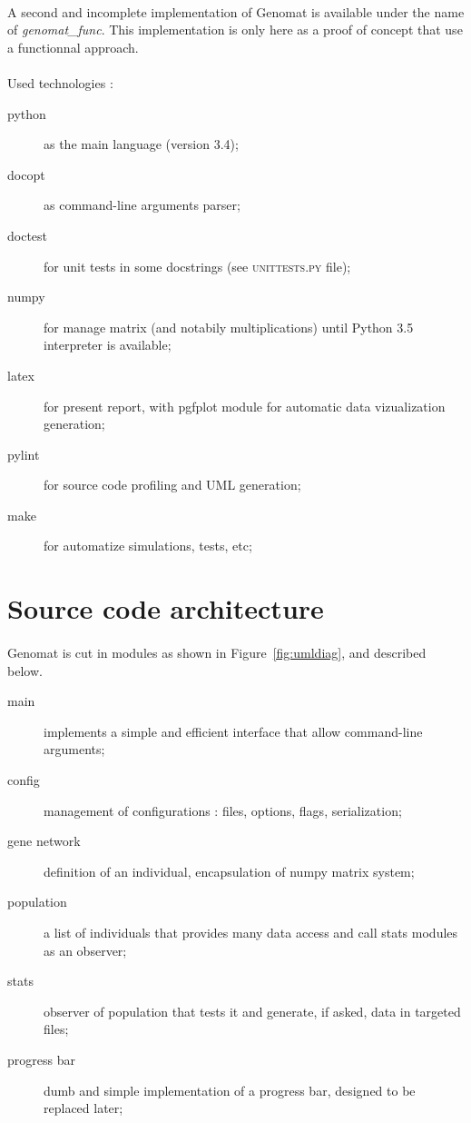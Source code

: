 \documentclass[]{report} %
\begin{document}
	\paragraph*{}
        A second and incomplete implementation of Genomat is available under the name of \textit{genomat\_func}. 
        This implementation is only here as a proof of concept that use a functionnal approach.

	\paragraph*{}
        Used technologies :
        \begin{description}
                \item[python] as the main language (version 3.4);
                \item[docopt] as command-line arguments parser;
                \item[doctest] for unit tests in some docstrings (see \textsc{unittests.py} file);
                \item[numpy] for manage matrix (and notabily multiplications) until Python 3.5 interpreter is available;
                \item[latex] for present report, with pgfplot module for automatic data vizualization generation;
                \item[pylint] for source code profiling and UML generation;
                \item[make] for automatize simulations, tests, etc;
        \end{description}



\section*{Source code architecture}
	\paragraph*{}
        Genomat is cut in modules as shown in Figure~\ref{fig:umldiag}, and described below.
        \begin{description}
                \item[main] implements a simple and efficient interface that allow command-line arguments;
                \item[config] management of configurations : files, options, flags, serialization;
                \item[gene network] definition of an individual, encapsulation of numpy matrix system;
                \item[population] a list of individuals that provides many data access and call stats modules as an observer;
                \item[stats] observer of population that tests it and generate, if asked, data in targeted files;
                \item[progress bar] dumb and simple implementation of a progress bar, designed to be replaced later;
        \end{description}
\end{document}
